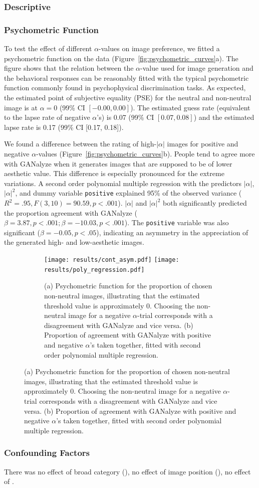 \documentclass[../main.tex]{subfiles}
\begin{document}
	\subsubsection{Descriptive}
	
	
	
	\subsubsection{Psychometric Function}
	To test the effect of different $\alpha$-values on image preference, we fitted a psychometric function on the data (Figure~\ref{fig:psychometric_curves}a). The figure shows that the relation between the $\alpha$-value used for image generation and the behavioral responses can be reasonably fitted with the typical psychometric function commonly found in psychophysical discrimination tasks. As expected, the estimated point of subjective equality (PSE) for the neutral and non-neutral image is at $\alpha = 0$ (99\% CI $[-0.00, 0.00]$). The estimated guess rate (equivalent to the lapse rate of negative $\alpha$'s) is 0.07 (99\% CI $[0.07, 0.08]$) and the estimated lapse rate is 0.17 (99\% CI [0.17, 0.18]).
	
	We found a difference between the rating of high-$|\alpha|$ images for positive and negative $\alpha$-values (Figure~\ref{fig:psychometric_curves}b). People tend to agree more with GANalyze when it generates images that are supposed to be of lower aesthetic value. This difference is especially pronounced for the extreme variations. A second order polynomial multiple regression with the predictors $|\alpha|$, $|\alpha|^2$, and dummy variable \texttt{positive} explained 95\% of the observed variance ($R^2=.95, F(3,10)=90.59, p<.001$). $|\alpha|$ and $|\alpha|^2$ both significantly predicted the proportion agreement with GANalyze ($\beta=3.87, p<.001; \beta=-10.03, p<.001$). The \texttt{positive} variable was also significant ($\beta=-0.05, p<.05$), indicating an asymmetry in the appreciation of the generated high- and low-aesthetic images.  

	\begin{figure}[h!]
		\caption{Behavioral Results from the Image Rating Task}
		\label{fig:psychometric_curves}
		\centering
		\begin{subfigure}{\textwidth}
			{\centering
			\texttt{[image: results/cont\_asym.pdf]}
			\hfill
			\texttt{[image: results/poly\_regression.pdf]}}
			\caption{\normalfont (a) Psychometric function for the proportion of chosen non-neutral images, illustrating that the estimated threshold value is approximately 0. Choosing the non-neutral image for a negative $\alpha$-trial corresponds with a disagreement with GANalyze and vice versa. (b) Proportion of agreement with GANalyze with positive and negative $\alpha$'s taken together, fitted with second order polynomial multiple regression.}
		\end{subfigure}
	\end{figure}

	\subsubsection{Confounding Factors}
	There was no effect of broad category (), no effect of image position (), no effect of  .
\end{document}
